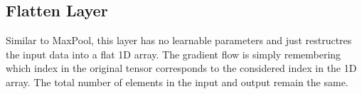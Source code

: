 \documentclass[../../deep_learning_notes.tex]{subfiles}
\begin{document}
\subsection{Flatten Layer}
Similar to MaxPool, this layer has no learnable parameters and just restructres the input data into a flat 1D array. The gradient flow is simply remembering which index in the original tensor corresponds to the considered index in the 1D array. The total number of elements in the input and output remain the same.
\end{document}
